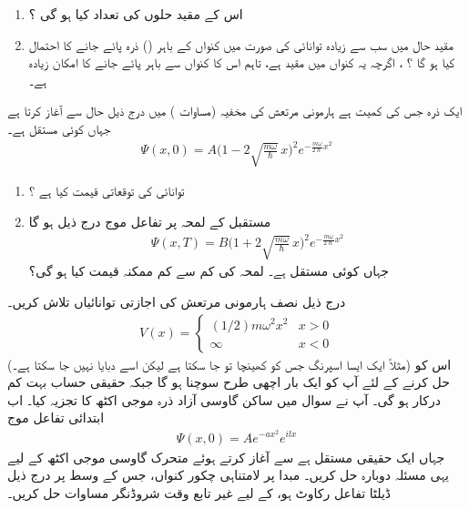 \begin{enumerate}
\item
 اس کے مقید حلوں کی تعداد کیا ہو گی ؟
\item 
 مقید حال میں سب سے زیادہ توانائی کی صورت میں کنواں کے باہر ()   ذرہ پائے جانے کا احتمال کیا ہو گا ؟
  ،  اگرچہ یہ کنواں میں مقید ہے،  تاہم اس کا  کنواں سے باہر پائے جانے کا امکان زیادہ ہے۔ 
\end{enumerate}
ایک ذرہ جس کی کمیت  ہے ہارمونی مرتعش کی مخفیہ (مساوات   )  میں درج ذیل حال سے آغاز  کرتا ہے  جہاں کوئی مستقل ہے۔
\begin{align*}
\Psi(x,0)=A\Big(1-2\sqrt{\frac{m\omega}{\hslash}}\, x  \Big)^{2}e^{-\frac{m\omega}{2\hslash}x^{2}}
\end{align*}
%
\begin{enumerate}
\item
 توانائی کی توقعاتی قیمت کیا ہے ؟
\item
مستقبل کے لمحہ   پر تفاعل موج درج ذیل ہو گا
\begin{align*}
\Psi(x,T)=B\Big(1+2\sqrt{\frac{m\omega}{\hslash}}\,x  \Big)^{2}e^{-\frac{m\omega}{2\hslash}x^{2}}   
\end{align*}
 جہاں  کوئی مستقل ہے۔ لمحہ   کی کم سے کم ممکنہ قیمت کیا ہو گی؟ 
\end{enumerate}
درج ذیل نصف ہارمونی مرتعش کی اجازتی توانائیاں تلاش کریں۔
\begin{align*}
V(x)=
\begin{cases}
(1/2)m\omega^{2}x^{2}&x> 0\\
\infty & x< 0
\end{cases}
 \end{align*}
(مثلاً ایک ایسا  اسپرنگ  جس کو کھینچا تو جا سکتا ہے لیکن اسے دبایا  نہیں جا سکتا ہے۔)     اس کو حل کرنے کے لئے آپ کو ایک بار اچھی طرح سوچنا  ہو  گا جبکہ حقیقی حساب بہت کم  درکار ہو گی۔ 
آپ نے سوال  میں ساکن گاوسی آزاد ذرہ موجی اکٹھ  کا تجزیہ کیا۔ اب ابتدائی تفاعل موج 
\begin{align*}
\Psi(x,0)=Ae^{-ax^{2}}e^{ilx} 
\end{align*} 
 جہاں ایک حقیقی مستقل ہے سے آغاز  کرتے ہوئے  متحرک گاوسی  موجی اکٹھ  کے لیے یہی مسئلہ دوبارہ حل کریں۔
مبدا  پر   لامتناہی چکور کنواں، جس کے وسط پر درج ذیل  ڈیلٹا تفاعل  رکاوٹ ہو،  کے لیے  غیر تابع وقت   شروڈنگر مساوات حل کریں۔
